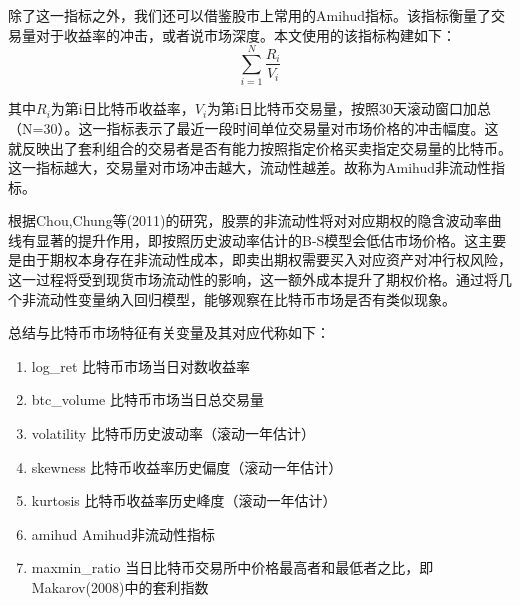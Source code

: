 \par{
    除了这一指标之外，我们还可以借鉴股市上常用的Amihud指标\cite{Yako-2002}。该指标衡量了交易量对于收益率的冲击，或者说市场深度。本文使用的该指标构建如下：
}
\begin{equation}
    \sum_{i=1}^{N}{\frac{R_i}{V_i}}
\end{equation}
\par{
    其中$R_i$为第i日比特币收益率，$V_i$为第i日比特币交易量，按照30天滚动窗口加总（N=30）。这一指标表示了最近一段时间单位交易量对市场价格的冲击幅度。这就反映出了套利组合的交易者是否有能力按照指定价格买卖指定交易量的比特币。这一指标越大，交易量对市场冲击越大，流动性越差。故称为Amihud非流动性指标。
}
\par{
    根据Chou,Chung等(2011)的研究，股票的非流动性将对对应期权的隐含波动率曲线有显著的提升作用\cite{doi:10.1002/fut.20531}，即按照历史波动率估计的B-S模型会低估市场价格。这主要是由于期权本身存在非流动性成本，即卖出期权需要买入对应资产对冲行权风险，这一过程将受到现货市场流动性的影响，这一额外成本提升了期权价格。通过将几个非流动性变量纳入回归模型，能够观察在比特币市场是否有类似现象。
}
\par{总结与比特币市场特征有关变量及其对应代称如下：}
\begin{enumerate}[(1)]
\item log\_ret 比特币市场当日对数收益率
\item btc\_volume 比特币市场当日总交易量
\item volatility 比特币历史波动率（滚动一年估计）
\item skewness 比特币收益率历史偏度（滚动一年估计）
\item kurtosis 比特币收益率历史峰度（滚动一年估计）
\item amihud Amihud非流动性指标
\item maxmin\_ratio 当日比特币交易所中价格最高者和最低者之比，即Makarov(2008)中的套利指数\cite{Makarov-2018}
\end{enumerate}
